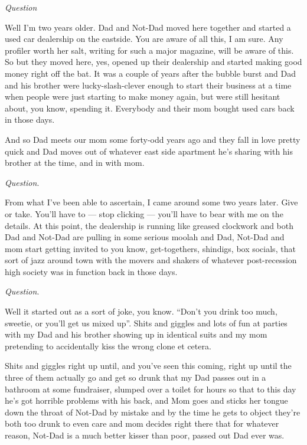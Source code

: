 {\em Question}



Well I'm two years older. Dad and Not-Dad moved here together
and started a used car dealership on the eastside. You are aware of
all this, I am sure. Any profiler worth her salt, writing for such
a major magazine, will be aware of this. So but they moved here,
yes, opened up their dealership and started making good money right
off the bat. It was a couple of years after the bubble burst and
Dad and his brother were lucky-slash-clever enough to start their
business at a time when people were just starting to make money
again, but were still hesitant about, you know, spending it.
Everybody and their mom bought used cars back in those days.

And so Dad meets our mom some forty-odd years ago and they fall in
love pretty quick and Dad moves out of whatever east side apartment
he's sharing with his brother at the time, and in with
mom.



{\em Question}.



From what I've been able to ascertain, I came around some two
years later. Give or take. You'll have to --- stop
clicking --- you'll have to bear with me on the details.
At this point, the dealership is running like greased clockwork and
both Dad and Not-Dad are pulling in some serious moolah and Dad,
Not-Dad and mom start getting invited to you know, get-togethers,
shindigs, box socials, that sort of jazz around town with the
movers and shakers of whatever post-recession high society was in
function back in those days.



{\em Question}.



Well it started out as a sort of joke, you know.
``Don't you drink too much, sweetie, or you'll get us mixed
up''. Shits and giggles and lots of fun at parties with my Dad and
his brother showing up in identical suits and my mom pretending to
accidentally kiss the wrong clone et cetera.

Shits and giggles right up until, and you've seen this
coming, right up until the three of them actually go and get so
drunk that my Dad passes out in a bathroom at some fundraiser,
slumped over a toilet for hours so that to this day he's got
horrible problems with his back, and Mom goes and sticks her tongue
down the throat of Not-Dad by mistake and by the time he gets to
object they're both too drunk to even care and mom decides
right there that for whatever reason, Not-Dad is a much better
kisser than poor, passed out Dad ever was.



